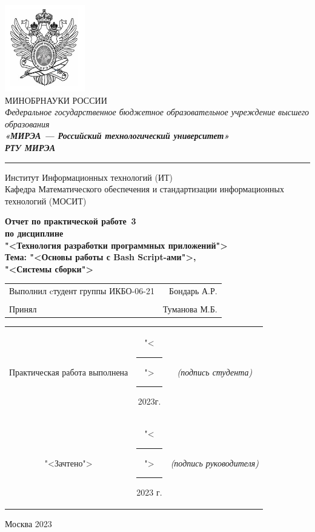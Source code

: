 \begin{center}
	\includegraphics[scale=0.5]{./res/logo.png}\\
	\normalsize{МИНОБРНАУКИ РОССИИ}\\
	\normalsize{\itshape Федеральное государственное бюджетное образовательное учреждение высшего образования}\\
	\normalsize{\bfseries\itshape«МИРЭА --- Российский технологический университет»}\\
	\large{\bfseries\itshape РТУ МИРЭА}\\
	\bigskip \hrule \smallskip
	\normalsize{Институт Информационных технологий (ИТ)}\\
	\vfill
	\normalsize{Кафедра Математического обеспечения и стандартизации информационных технологий (МОСИТ)}\\
	\vfill
	\begin{normalsize}
	  \textbf{
	    Отчет по практической работе \No\,3\\
	    по дисциплине\\
	    "<Технология разработки программных приложений">\\
	    Тема: "<Основы работы с Bash Script-ами">,\\
		"<Системы сборки">
	  }
	\end{normalsize}
	\vfill
	\vfill
	\begin{small}
		\begin{tabular}{lr}
			Выполнил cтудент группы ИКБО-06-21 & Бондарь А.Р.\\\\
			Принял & Туманова М.Б.\\
		\end{tabular}
	\end{small}
	\vfill
	\begin{footnotesize}
		\begin{tabular}{ccc}
			Практическая  работа выполнена
			& "<\rule{1ex}{.5pt}">\rule{7ex}{.5pt}2023г.
			& \textit{(подпись студента)}\\
			"<Зачтено"> 
			& "<\rule{1ex}{.5pt}">\rule{7ex}{.5pt}2023 г.
			& \textit{(подпись руководителя)}\\
		\end{tabular}
	\end{footnotesize}
	\vfill
\end{center}

\begin{center} Москва 2023 \end{center}

\thispagestyle{empty}
